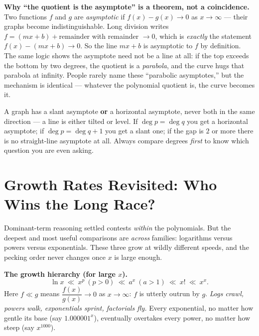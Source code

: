 \begin{whybox}
\textbf{Why ``the quotient is the asymptote'' is a theorem, not a coincidence.}
Two functions $f$ and $g$ are \emph{asymptotic} if $f(x)-g(x)\to 0$ as
$x\to\infty$ --- their graphs become indistinguishable. Long division writes
$f = (mx+b) + \text{remainder}$ with remainder $\to 0$, which is \emph{exactly}
the statement $f(x)-(mx+b)\to 0$. So the line $mx+b$ is asymptotic to $f$ by
definition. The same logic shows the asymptote need not be a line at all: if the
top exceeds the bottom by two degrees, the quotient is a \emph{parabola}, and the
curve hugs that parabola at infinity. People rarely name these ``parabolic
asymptotes,'' but the mechanism is identical --- whatever the polynomial quotient
is, the curve becomes it.
\end{whybox}

\begin{trapbox}
A graph has a slant asymptote \textbf{or} a horizontal asymptote, never both in
the same direction --- a line is either tilted or level. If $\deg p = \deg q$ you
get a horizontal asymptote; if $\deg p = \deg q + 1$ you get a slant one; if the
gap is $2$ or more there is no straight-line asymptote at all. Always compare
degrees \emph{first} to know which question you are even asking.
\end{trapbox}

\section{Growth Rates Revisited: Who Wins the Long Race?}
\label{ch09:growth}

Dominant-term reasoning settled contests \emph{within} the polynomials. But the
deepest and most useful comparisons are \emph{across} families: logarithms
versus powers versus exponentials. These three grow at wildly different speeds,
and the pecking order never changes once $x$ is large enough.

\begin{focusbox}
\textbf{The growth hierarchy (for large $x$).}
\[
   \ln x \ \ll\ x^{p}\ (p>0) \ \ll\ a^{x}\ (a>1) \ \ll\ x! \ \ll\ x^{x}.
\]
Here $f \ll g$ means $\dfrac{f(x)}{g(x)}\to 0$ as $x\to\infty$: $f$ is utterly
outrun by $g$. \emph{Logs crawl, powers walk, exponentials sprint, factorials
fly.} Every exponential, no matter how gentle its base (say $1.000001^x$),
eventually overtakes every power, no matter how steep (say $x^{1000}$).
\end{focusbox}

